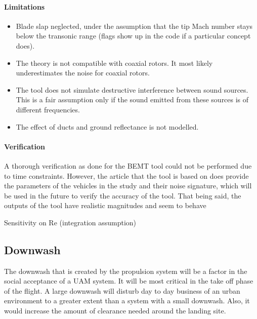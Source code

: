 \paragraph{Limitations}

\begin{itemize}
    \item Blade slap neglected, under the assumption that the tip Mach number stays below the transonic range (flags show up in the code if a particular concept does).
    \item The theory is not compatible with coaxial rotors. It most likely underestimates the noise for coaxial rotors. 
    \item The tool does not simulate destructive interference between sound sources. This is a fair assumption only if the sound emitted from these sources is of different frequencies.
    \item The effect of ducts and ground reflectance is not modelled.
\end{itemize}
 
\paragraph{Verification}

A thorough verification as done for the BEMT tool could not be performed due to time constraints. However, the article that the tool is based on does provide the parameters of the vehicles in the study and their noise signature, which will be used in the future to verify the accuracy of the tool. That being said, the outputs of the tool have realistic magnitudes and seem to behave


Sensitivity on Re (integration assumption)











\subsection{Downwash}
The downwash that is created by the propulsion system will be a factor in the social acceptance of a UAM system. It will be most critical in the take off phase of the flight. A large downwash will disturb day to day business of an urban environment to a greater extent than a system with a small downwash. Also, it would increase the amount of clearance needed around the landing site. 

